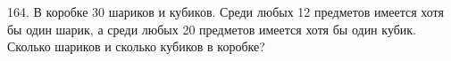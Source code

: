 164. В коробке 30 шариков и кубиков. Среди любых 12 предметов имеется хотя бы один шарик, а среди любых 20 предметов имеется хотя бы один кубик. Сколько шариков и сколько кубиков в коробке?\\

